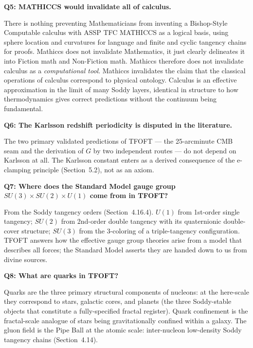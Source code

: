 \documentclass[11pt,a4paper]{article}
\begin{document}
\begin{mdframed}
\textbf{Q5: MATHICCS would invalidate all of calculus.}
\end{mdframed}

There is nothing preventing Mathematicians from inventing a Bishop-Style Computable calculus with ASSP TFC MATHICCS as a logical basis, using sphere location and curvatures for language and finite and cyclic tangency chains for proofs. Mathiccs does not invalidate Mathematics, it just clearly delineates it into Fiction math and Non-Fiction math. Mathiccs therefore does not invalidate calculus as a \emph{computational tool}. Mathiccs invalidates the claim that the classical operations of calculus correspond to physical ontology. Calculus is an effective approximation in the limit of many Soddy layers, identical in structure to how thermodynamics gives correct predictions without the continuum being fundamental.

\begin{mdframed}
\textbf{Q6: The Karlsson redshift periodicity is disputed in the literature.}
\end{mdframed}

The two primary validated predictions of TFOFT --- the 25-arcminute CMB seam and the derivation of $G$ by two independent routes --- do not depend on Karlsson at all. The Karlsson constant enters as a derived consequence of the e-clamping principle (Section~5.2), not as an axiom.

\begin{mdframed}
\textbf{Q7: Where does the Standard Model gauge group $SU(3)\times SU(2)\times U(1)$
come from in TFOFT?}
\end{mdframed}

From the Soddy tangency orders (Section~4.16.4). $U(1)$ from 1st-order single tangency; $SU(2)$ from 2nd-order double tangency with its quaternionic double-cover structure; $SU(3)$ from the 3-coloring of a triple-tangency configuration. TFOFT answers how the effective gauge group theories arise from a model that describes all forces; the Standard Model asserts they are handed down to us from divine sources. 

\begin{mdframed}
\textbf{Q8: What are quarks in TFOFT?}
\end{mdframed}

Quarks are the three primary structural components of nucleons: at the here-scale they correspond to stars, galactic cores, and planets (the three Soddy-stable objects that constitute a fully-specified fractal register). Quark confinement is the
fractal-scale analogue of stars being gravitationally confined within a galaxy. The gluon field is the Pipe Ball at the atomic scale: inter-nucleon low-density Soddy tangency chains (Section~4.14).
\end{document}
